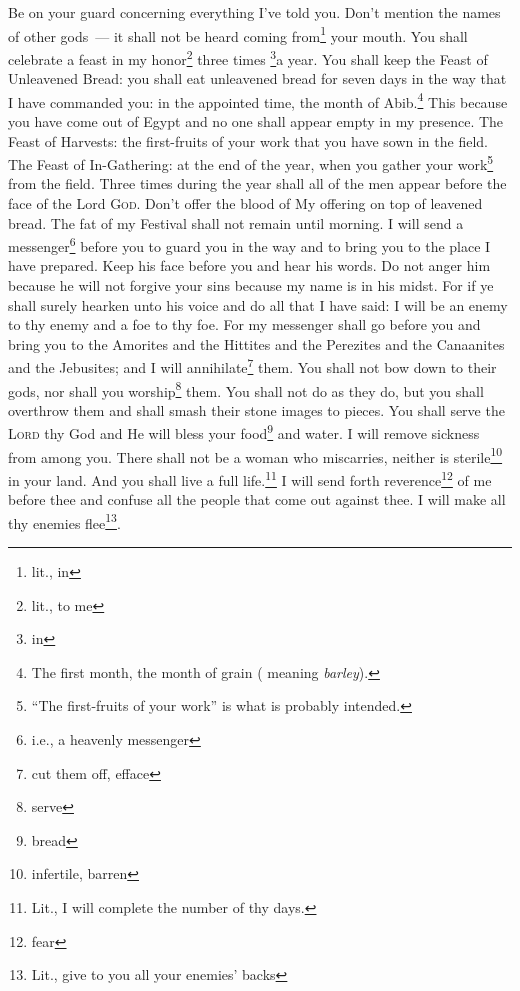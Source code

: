 \begin{enumerate}[align=center]
     Be on your guard concerning everything I've told you. Don't mention the names of other gods~--- it shall not be heard coming from\footnote{lit., in} your mouth.%
     You shall celebrate a feast in my honor\footnote{lit., to me} three times \footnote{in}a year.%
     You shall keep the Feast of Unleavened Bread: you shall eat unleavened bread for seven days in the way that I have commanded you: in the appointed time, the month of Abib.\footnote{The first month, the month of grain ( meaning \textit{barley}).} This because you have come out of Egypt and no one shall appear empty in my presence.%
     The Feast of Harvests: the first-fruits of your work that you have sown in the field. The Feast of In-Gathering: at the end of the year, when you gather your work\footnote{``The first-fruits of your work'' is what is probably intended.} from the field.%
     Three times during the year shall all of the men appear before the face of the Lord \textsc{God}.%
     Don't offer the blood of My offering on top of leavened bread. The fat of my Festival shall not remain until morning.%
     I will send a messenger\footnote{i.e., a heavenly messenger} before you to guard you in the way and to bring you to the place I have prepared.%
     Keep his face before you and hear his words. Do not anger him because he will not forgive your sins because my name is in his midst.%
     For if ye shall surely hearken unto his voice and do all that I have said: I will be an enemy to thy enemy and a foe to thy foe.%
     For my messenger shall go before you and bring you to the Amorites and the Hittites and the Perezites and the Canaanites and the Jebusites; and I will annihilate\footnote{cut them off, efface} them.%
     You shall not bow down to their gods, nor shall you worship\footnote{serve} them. You shall not do as they do, but you shall overthrow them and shall smash their stone images to pieces.%
     You shall serve the \textsc{Lord} thy God and He will bless your food\footnote{bread} and water. I will remove sickness from among you.%
     There shall not be a woman who miscarries, neither is sterile\footnote{infertile, barren} in your land. And you shall live a full life.\footnote{Lit., I will complete the number of thy days.}%
     I will send forth reverence\footnote{fear} of me before thee and confuse all the people that come out against thee. I will make all thy enemies flee\footnote{Lit., give to you all your enemies' backs}.%

\end{enumerate}
